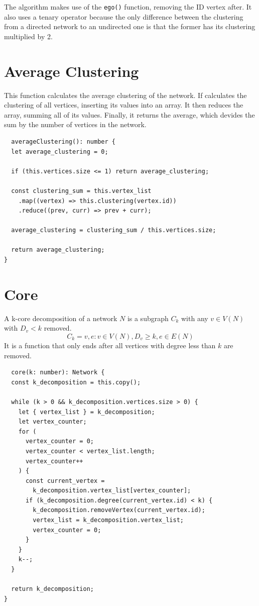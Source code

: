 The algorithm makes use of the \texttt{ego()} function, removing the ID vertex after.
It also uses a tenary operator because the only difference between the clustering
from a directed network to an undirected one is
that the former has its clustering multiplied by 2.

\section{Average Clustering}

This function calculates the average clustering of the network.
If calculates the clustering of all vertices, inserting its values into an array.
It then reduces the array, summing all of its values.
Finally, it returns the average, which devides the sum by the number of vertices in the network.
\begin{verbatim}
  averageClustering(): number {
  let average_clustering = 0;

  if (this.vertices.size <= 1) return average_clustering;

  const clustering_sum = this.vertex_list
    .map((vertex) => this.clustering(vertex.id))
    .reduce((prev, curr) => prev + curr);

  average_clustering = clustering_sum / this.vertices.size;

  return average_clustering;
}
\end{verbatim}

\section{Core}

A k-core decomposition of a network $N$ is a subgraph $C_k$ with any
$v\in V(N)$ with $D_v<k$ removed.
$$C_k={v,e:v\in V(N), D_v\geq k,e\in E(N)}$$
It is a function that only ends after all vertices with degree less than $k$ are removed.

\begin{verbatim}
  core(k: number): Network {
  const k_decomposition = this.copy();

  while (k > 0 && k_decomposition.vertices.size > 0) {
    let { vertex_list } = k_decomposition;
    let vertex_counter;
    for (
      vertex_counter = 0;
      vertex_counter < vertex_list.length;
      vertex_counter++
    ) {
      const current_vertex =
        k_decomposition.vertex_list[vertex_counter];
      if (k_decomposition.degree(current_vertex.id) < k) {
        k_decomposition.removeVertex(current_vertex.id);
        vertex_list = k_decomposition.vertex_list;
        vertex_counter = 0;
      }
    }
    k--;
  }

  return k_decomposition;
}
\end{verbatim}

